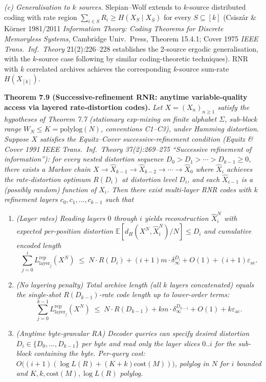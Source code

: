 \documentclass[
]{article}
\begin{document}
\emph{(c) Generalisation to $k$ sources.} Slepian--Wolf extends to
$k$-source distributed coding with rate region $\sum_{i \in S} R_i
\geq H(X_S \mid X_{\bar{S}})$ for every $S \subseteq [k]$
(Csisz{\'a}r \& K{\"o}rner 1981/2011 \emph{Information Theory: Coding
Theorems for Discrete Memoryless Systems}, Cambridge Univ.\ Press,
Theorem 15.4.1; Cover 1975 \emph{IEEE Trans.\ Inf.\ Theory}
21(2):226--228 establishes the 2-source ergodic generalisation, with
the $k$-source case following by similar coding-theoretic
techniques). RNR with $k$ correlated archives achieves the
corresponding $k$-source sum-rate $H(X_{[k]})$.

\textbf{Theorem 7.9 (Successive-refinement RNR: anytime variable-quality
access via layered rate-distortion codes).}
\emph{Let $X = (X_n)_{n \geq 1}$ satisfy the hypotheses of Theorem 7.7
(stationary exp-mixing on finite alphabet $\Sigma$, sub-block range
$W_N \leq K = \mathrm{polylog}(N)$, conventions C1--C3), under Hamming
distortion. Suppose $X$ satisfies the \emph{Equitz--Cover
successive-refinement condition} (Equitz \& Cover 1991
\emph{IEEE Trans.\ Inf.\ Theory} 37(2):269--275
``Successive refinement of information''): for every nested distortion
sequence $D_0 > D_1 > \cdots > D_{k-1} \geq 0$, there exists a Markov
chain $X \rightarrow \hat{X}_{k-1} \rightarrow \hat{X}_{k-2} \rightarrow
\cdots \rightarrow \hat{X}_0$ where $\hat{X}_i$ achieves the rate-distortion
optimum $R(D_i)$ at distortion level $D_i$, and each $\hat{X}_{i-1}$
is a (possibly random) function of $\hat{X}_i$. Then there exist
multi-layer RNR codes with $k$ refinement layers $c_0, c_1, \ldots,
c_{k-1}$ such that}
\begin{enumerate}
\item \emph{(Layer rates) Reading layers $0$ through $i$ yields
reconstruction $\hat{X}^N_i$ with expected per-position distortion
$\mathbb{E}[d_H(X^N, \hat{X}^N_i)/N] \leq D_i$ and cumulative encoded
length}
\[
\sum_{j = 0}^{i} L^{\mathrm{rep}}_{\mathrm{layer}_j}(X^N)
\;\leq\;
N \cdot R(D_i) + (i+1) m \cdot \delta_\infty^{D_i} + O(1) + (i+1) \varepsilon_{\mathrm{ac}}.
\]
\item \emph{(No layering penalty) Total archive length (all $k$ layers
concatenated) equals the single-shot $R(D_{k-1})$-rate code length up
to lower-order terms:}
\[
\sum_{j = 0}^{k-1} L^{\mathrm{rep}}_{\mathrm{layer}_j}(X^N)
\;\leq\;
N \cdot R(D_{k-1}) + k m \cdot \delta_\infty^{D_{k-1}} + O(1) + k \varepsilon_{\mathrm{ac}}.
\]
\item \emph{(Anytime byte-granular RA) Decoder queries can specify
desired distortion $D_i \in \{D_0, \ldots, D_{k-1}\}$ per byte and read
only the layer slices $0..i$ for the sub-block containing the byte.
Per-query cost: $O\bigl((i+1) (\log L(R) + (K+k) \mathrm{cost}(M))\bigr)$,
polylog in $N$ for $i$ bounded and $K, k, \mathrm{cost}(M),
\log L(R)$ polylog.}
\end{enumerate}
\end{document}
